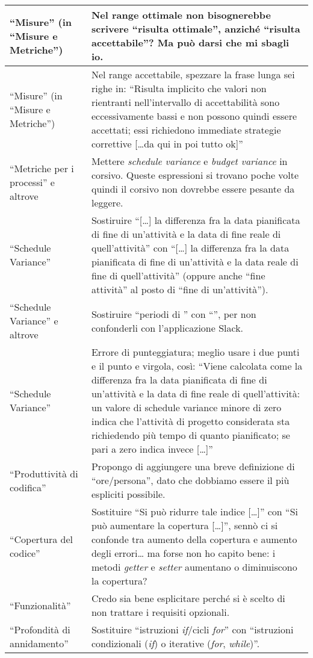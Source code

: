 \documentclass[a4paper]{article}
\begin{document}
\begin{longtable}{| p{3cm} | p{10cm} |}
	“Misure” (in “Misure e Metriche”) & Nel range ottimale non bisognerebbe scrivere “risulta ottimale”, anziché “risulta accettabile”? Ma può darsi che mi sbagli io. \\ \hline
	“Misure” (in “Misure e Metriche”) & Nel range accettabile, spezzare la frase lunga sei righe in: “Risulta implicito che valori non rientranti nell'intervallo di accettabilità sono eccessivamente bassi e non possono quindi essere accettati; essi richiedono immediate strategie correttive [\dots da qui in poi tutto ok]” \\ \hline
	“Metriche per i processi” e altrove & Mettere \emph{schedule variance} e \emph{budget variance} in corsivo. Queste espressioni si trovano poche volte quindi il corsivo non dovrebbe essere pesante da leggere. \\ \hline
	“Schedule Variance” & Sostiruire “[\dots] la differenza fra la data pianificata di fine di un’attività e la data di fine reale di quell'attività” con “[\dots] la differenza fra la data pianificata di fine di un’attività e la data reale di fine di quell'attività” (oppure anche “fine attività” al posto di “fine di un'attività”). \\ \hline
	“Schedule Variance” e altrove & Sostiruire “periodi di \gloss{slack}” con “\gloss{periodi di slack}”, per non confonderli con l'applicazione Slack. \\ \hline
	“Schedule Variance” & Errore di punteggiatura; meglio usare i due punti e il punto e virgola, così: “Viene calcolata come la differenza fra la data pianificata di fine di un'attività e la data di fine reale di quell'attività: un valore di schedule variance minore di zero indica che l'attività di progetto considerata sta richiedendo più tempo di quanto pianificato; se pari a zero indica invece [\dots]” \\ \hline
	“Produttività di codifica” & Propongo di aggiungere una breve definizione di “ore/persona”, dato che dobbiamo essere il più espliciti possibile. \\ \hline
	“Copertura del codice” & Sostituire “Si può ridurre tale indice [\dots]” con “Si può aumentare la copertura [\dots]”, sennò ci si confonde tra aumento della copertura e aumento degli errori\dots{} ma forse non ho capito bene: i metodi \emph{getter} e \emph{setter} aumentano o diminuiscono la copertura? \\ \hline
	“Funzionalità” & Credo sia bene esplicitare perché si è scelto di non trattare i requisiti opzionali. \\ \hline
	“Profondità di annidamento” & Sostituire “istruzioni \emph{if}/cicli \emph{for}” con “istruzioni condizionali (\emph{if}) o iterative (\emph{for}, \emph{while})”. \\ \hline

\end{longtable}
\end{document}

